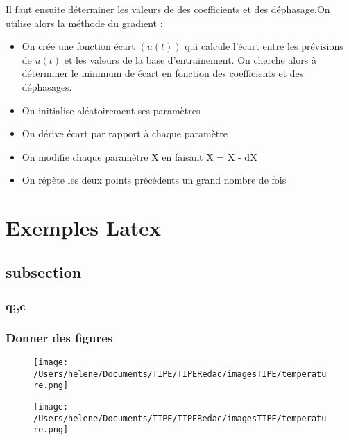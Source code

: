 \documentclass[11pt,a4paper]{article}
\begin{document}
Il faut ensuite déterminer les valeurs de des coefficients et des déphasage.On utilise alors la méthode du gradient :
\begin{itemize}
\item On crée une fonction écart $(u(t))$ qui calcule l'écart entre les prévisions de $u(t)$ et les valeurs de la base d'entrainement. On cherche alors à déterminer le minimum de écart en fonction des coefficients et des déphasages.
\item On initialise aléatoirement ses paramètres
\item On dérive écart par rapport à chaque paramètre
\item On modifie chaque paramètre X en faisant X = X - dX
\item On répète les deux points précédents un grand nombre de fois
\end{itemize}






























\section{Exemples Latex}
\subsection{subsection}
\subsubsection{q;,c}
\subsubsection{Donner des figures}

\begin{figure}
  \texttt{[image: /Users/helene/Documents/TIPE/TIPERedac/imagesTIPE/temperature.png]}\quad
\end{figure}
\begin{figure}
  \texttt{[image: /Users/helene/Documents/TIPE/TIPERedac/imagesTIPE/temperature.png]}\quad
\end{figure}
\end{document}
